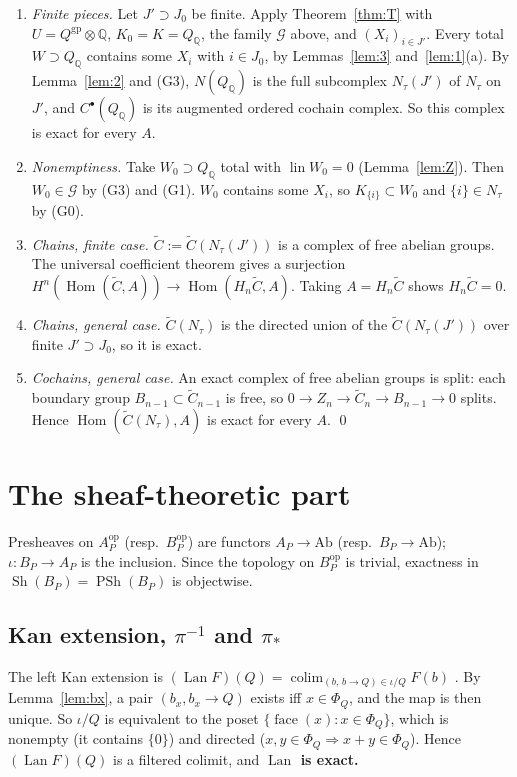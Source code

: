 \documentclass[11pt]{article}
\theoremstyle{definition}
\theoremstyle{remark}
\newcommand{\QQ}{\mathbb{Q}}
\newcommand{\gp}{\mathrm{gp}}
\newcommand{\face}{\operatorname{face}}
\newcommand{\Hom}{\operatorname{Hom}}
\newcommand{\lin}{\operatorname{lin}}
\newcommand{\Lan}{\operatorname{Lan}}
\newcommand{\colim}{\operatorname*{colim}}
\newcommand{\cG}{\mathcal{G}}
\newcommand{\Sh}{\operatorname{Sh}}
\newcommand{\PSh}{\operatorname{PSh}}
\newcommand{\Qrat}{Q_{\QQ}}
\begin{document}
\begin{enumerate}[1.]


\item \emph{Finite pieces.} Let $J'\supset J_0$ be finite. Apply Theorem~\ref{thm:T} with $U=Q^{\gp}\otimes\QQ$, $K_0=K=\Qrat$, the family $\cG$ above, and $(X_i)_{i\in J'}$. Every total $W\supset\Qrat$ contains some $X_i$ with $i\in J_0$, by Lemmas~\ref{lem:3} and~\ref{lem:1}(a). By Lemma~\ref{lem:2} and (G3), $N(\Qrat)$ is the full subcomplex $N_\tau(J')$ of $N_\tau$ on $J'$, and $C^\bullet(\Qrat)$ is its augmented ordered cochain complex. So this complex is exact for every $A$.
\item \emph{Nonemptiness.} Take $W_0\supset\Qrat$ total with $\lin W_0=0$ (Lemma~\ref{lem:Z}). Then $W_0\in\cG$ by (G3) and (G1). $W_0$ contains some $X_i$, so $K_{\{i\}}\subset W_0$ and $\{i\}\in N_\tau$ by (G0).
\item \emph{Chains, finite case.} $\tilde C:=\tilde C(N_\tau(J'))$ is a complex of free abelian groups. The universal coefficient theorem \cite[\S3.1]{Hatcher} gives a surjection $H^n(\Hom(\tilde C,A))\to\Hom(H_n\tilde C,A)$. Taking $A=H_n\tilde C$ shows $H_n\tilde C=0$.
\item \emph{Chains, general case.} $\tilde C(N_\tau)$ is the directed union of the $\tilde C(N_\tau(J'))$ over finite $J'\supset J_0$, so it is exact.
\item \emph{Cochains, general case.} An exact complex of free abelian groups is split: each boundary group $B_{n-1}\subset\tilde C_{n-1}$ is free, so $0\to Z_n\to\tilde C_n\to B_{n-1}\to0$ splits. Hence $\Hom(\tilde C(N_\tau),A)$ is exact for every $A$. \qed
\end{enumerate}

\section{The sheaf-theoretic part}\label{sec:sheaf}

Presheaves on $A_P^{\mathrm{op}}$ (resp.\ $B_P^{\mathrm{op}}$) are functors $A_P\to\mathrm{Ab}$ (resp.\ $B_P\to\mathrm{Ab}$); $\iota\colon B_P\to A_P$ is the inclusion. Since the topology on $B_P^{\mathrm{op}}$ is trivial, exactness in $\Sh(B_P)=\PSh(B_P)$ is objectwise.

\subsection{\texorpdfstring{Kan extension, $\pi^{-1}$ and $\pi_*$}{Kan extension}}
The left Kan extension is $(\Lan F)(Q)=\colim_{(b,\,b\to Q)\in\iota/Q}F(b)$ \cite[Ch.~X]{MacLane}. By Lemma~\ref{lem:bx}, a pair $(b_x,b_x\to Q)$ exists iff $x\in\Phi_Q$, and the map is then unique. So $\iota/Q$ is equivalent to the poset $\{\face(x):x\in\Phi_Q\}$, which is nonempty (it contains $\{0\}$) and directed ($x,y\in\Phi_Q\Rightarrow x+y\in\Phi_Q$). Hence $(\Lan F)(Q)$ is a filtered colimit, and \textbf{$\Lan$ is exact.}
\end{document}
